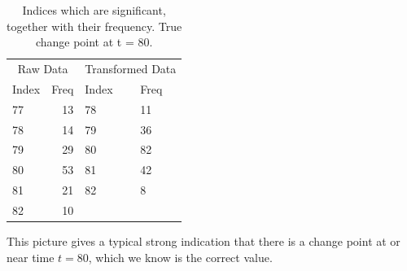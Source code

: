 \documentclass[smallextended]{svjour3}       %
\begin{document}
\begin{example}
\goodbreak
\begin{longtable}[t]{lrll}
\caption{\label{tab:chunk_4_5}Indices which are significant, together with their frequency. True change point at t = 80.}\\
\toprule
\multicolumn{2}{c}{Raw Data} & \multicolumn{2}{c}{Transformed Data} \\
\cmidrule(l{2pt}r{2pt}){1-2} \cmidrule(l{2pt}r{2pt}){3-4}
Index & Freq & Index & Freq\\
\midrule
77 & 13 & 78 & 11\\
78 & 14 & 79 & 36\\
79 & 29 & 80 & 82\\
80 & 53 & 81 & 42\\
81 & 21 & 82 & 8\\
82 & 10 &  & \\
\bottomrule
\end{longtable}

This picture gives a typical strong indication that there is a change
point at or near time \(t = 80\), which we know is the correct value.

\end{example}
\end{document}
